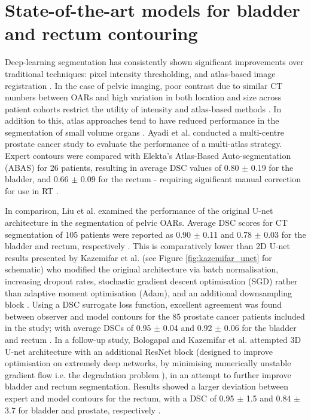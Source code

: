 \section{State-of-the-art models for bladder and rectum contouring}
Deep-learning segmentation has consistently shown significant improvements over traditional techniques: pixel intensity thresholding, and atlas-based image registration \cite{Cardenas2019}. In the case of pelvic imaging, poor contrast due to similar CT numbers between OARs and high variation in both location and size across patient cohorts restrict the utility of intensity and atlas-based methods \cite{acosta2013}. In addition to this, atlas approaches tend to have reduced performance in the segmentation of small volume organs \cite{acosta2013}. Ayadi et al. conducted a multi-centre prostate cancer study to evaluate the performance of a multi-atlas strategy. Expert contours were compared with Elekta's Atlas-Based Auto-segmentation (ABAS) for 26 patients, resulting in average DSC values of 0.80 $\pm$ 0.19 for the bladder, and 0.66 $\pm$ 0.09 for the rectum - requiring significant manual correction for use in RT \cite{Ayadi2011}.

In comparison, Liu et al. examined the performance of the original U-net architecture in the segmentation of pelvic OARs. Average DSC scores for CT segmentation of 105 patients were reported as 0.90 $\pm$ 0.11 and 0.78 $\pm$ 0.03 for the bladder and rectum, respectively \cite{Liu_2020}. This is comparatively lower than 2D U-net results presented by Kazemifar et al. (see Figure \ref{fig:kazemifar_unet} for schematic) who modified the original architecture via batch normalisation, increasing dropout rates, stochastic gradient descent optimisation (SGD) rather than adaptive moment optimisation (Adam), and an additional downsampling block \cite{Kazemifar_2018}. Using a DSC surrogate loss function, excellent agreement was found between observer and model contours for the 85 prostate cancer patients included in the study; with average DSCs of 0.95 $\pm$ 0.04 and 0.92 $\pm$ 0.06 for the bladder and rectum \cite{Kazemifar_2018}. In a follow-up study, Bologapal and Kazemifar et al. attempted 3D U-net architecture with an additional ResNet block (designed to improve optimisation on extremely deep networks, by minimising numerically unstable gradient flow \cite{Maier2019} i.e. the degradation problem \cite{He2015deep}), in an attempt to further improve bladder and rectum segmentation. Results showed a larger deviation between expert and model contours for the rectum, with a DSC of 0.95 $\pm$ 1.5 and 0.84 $\pm$ 3.7 for bladder and prostate, respectively \cite{Balagopal_2018}. 

